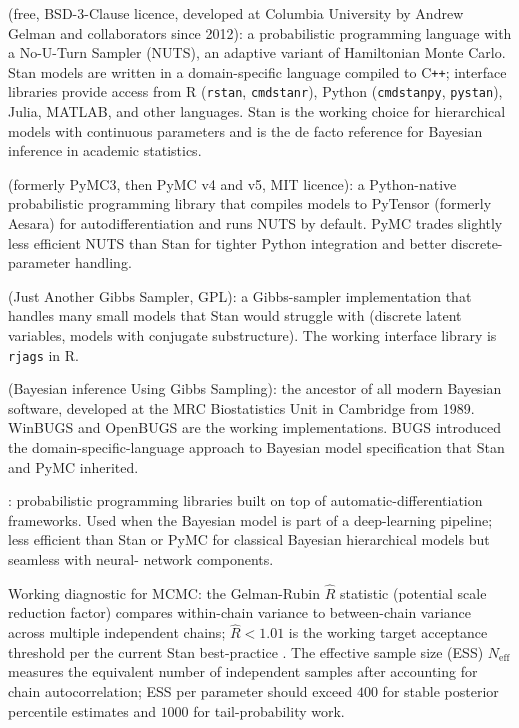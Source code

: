  (free, BSD-3-Clause licence, developed at Columbia
University by Andrew Gelman and collaborators since 2012): a probabilistic
programming language with a No-U-Turn Sampler (NUTS), an
adaptive variant of Hamiltonian Monte Carlo. Stan models are
written in a domain-specific language compiled to C\texttt{++};
interface libraries provide access from R (\texttt{rstan},
\texttt{cmdstanr}), Python (\texttt{cmdstanpy}, \texttt{pystan}),
Julia, MATLAB, and other languages. Stan is the working choice
for hierarchical models with continuous parameters and is the
de facto reference for Bayesian inference in academic
statistics.

 (formerly PyMC3, then PyMC v4 and v5, MIT licence):
a Python-native probabilistic programming library that compiles
models to PyTensor (formerly Aesara) for autodifferentiation and
runs NUTS by default. PyMC trades slightly less efficient NUTS
than Stan for tighter Python integration and better discrete-
parameter handling.

 (Just Another Gibbs Sampler, GPL): a Gibbs-sampler
implementation that handles many small models that Stan would
struggle with (discrete latent variables, models with conjugate
substructure). The working interface library is \texttt{rjags} in
R.

 (Bayesian inference Using Gibbs Sampling): the
ancestor of all modern Bayesian software, developed at the MRC
Biostatistics Unit in Cambridge from 1989. WinBUGS and OpenBUGS
are the working implementations. BUGS introduced the
domain-specific-language approach to Bayesian model
specification that Stan and PyMC inherited.

: probabilistic
programming libraries built on top of automatic-differentiation
frameworks. Used when the Bayesian model is part of a
deep-learning pipeline; less efficient than Stan or PyMC for
classical Bayesian hierarchical models but seamless with neural-
network components.

Working diagnostic for MCMC: the Gelman-Rubin
$\hat{R}$ statistic (potential scale reduction factor) compares
within-chain variance to between-chain variance across multiple
independent chains; $\hat{R} < 1.01$ is the working target
acceptance threshold per the current Stan best-practice
\cite{text:ch08-gelman-bda3-2013}. The effective sample size
(ESS) $N_{\text{eff}}$ measures the equivalent number of
independent samples after accounting for chain autocorrelation;
ESS per parameter should exceed $400$ for stable posterior
percentile estimates and $1000$ for tail-probability work.

